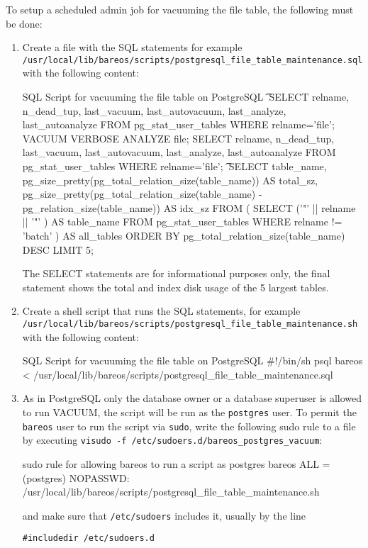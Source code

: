 To setup a scheduled admin job for vacuuming the file table, the following must be done:

\begin{enumerate}
\item Create a file with the SQL statements for example\\
\texttt{/usr/local/lib/bareos/scripts/postgresql\_file\_table\_maintenance.sql}\\
with the following content:
\begin{commands}{SQL Script for vacuuming the file table on PostgreSQL}
\t \x
SELECT relname, n_dead_tup, last_vacuum, last_autovacuum, last_analyze, last_autoanalyze
FROM pg_stat_user_tables WHERE relname='file';
VACUUM VERBOSE ANALYZE file;
SELECT relname, n_dead_tup, last_vacuum, last_autovacuum, last_analyze, last_autoanalyze
FROM pg_stat_user_tables WHERE relname='file';
\t \x
SELECT table_name,
  pg_size_pretty(pg_total_relation_size(table_name)) AS total_sz,
  pg_size_pretty(pg_total_relation_size(table_name) - pg_relation_size(table_name)) AS idx_sz
  FROM ( SELECT ('"' || relname || '"' ) AS table_name
    FROM pg_stat_user_tables WHERE relname != 'batch' ) AS all_tables
  ORDER BY pg_total_relation_size(table_name) DESC LIMIT 5;
\end{commands}
The SELECT statements are for informational purposes only, the final statement
shows the total and index disk usage of the 5 largest tables.

\item Create a shell script that runs the SQL statements, for example\\
\texttt{/usr/local/lib/bareos/scripts/postgresql\_file\_table\_maintenance.sh}\\
with the following content:
\begin{commands}{SQL Script for vacuuming the file table on PostgreSQL}
#!/bin/sh
psql bareos < /usr/local/lib/bareos/scripts/postgresql_file_table_maintenance.sql
\end{commands}

\item As in PostgreSQL only the database owner or a database superuser is allowed
to run VACUUM, the script will be run as the \texttt{postgres} user. To permit
the \texttt{bareos} user to run the script via \texttt{sudo}, write the following
sudo rule to a file by executing \texttt{visudo -f /etc/sudoers.d/bareos\_postgres\_vacuum}:
\begin{commands}{sudo rule for allowing bareos to run a script as postgres}
bareos ALL = (postgres) NOPASSWD: /usr/local/lib/bareos/scripts/postgresql_file_table_maintenance.sh
\end{commands}
and make sure that \texttt{/etc/sudoers} includes it, usually by the line
\footnotesize
\begin{verbatim}
#includedir /etc/sudoers.d
\end{verbatim}
\normalsize


\end{enumerate}
